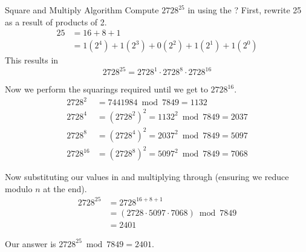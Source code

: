 \begin{example}{Square and Multiply Algorithm}
  Compute $2728^{25}$ in  using the ?
  \tcblower{}
  First, rewrite 25 as a result of products of 2.
  \begin{align*}
    25 &= 16 + 8 + 1 \\
    &= 1 (2^{4}) + 1 (2^{3}) + 0 (2^{2}) + 1 (2^{1}) + 1 (2^{0})
  \end{align*}
  This results in
  \begin{equation*}
    2728^{25} = 2728^{1} \cdot 2728^{8} \cdot 2728^{16}
  \end{equation*}

  Now we perform the squarings required until we get to $2728^{16}$.
  \begin{align*}
    2728^{2} &= 7441984 \bmod 7849 = 1132 \\
    2728^{4} &= {(2728^{2})}^{2} = 1132^{2} \bmod 7849 = 2037 \\
    2728^{8} &= {(2728^{4})}^{2} = 2037^{2} \bmod 7849 = 5097 \\
    2728^{16} &= {(2728^{8})}^{2} = 5097^{2} \bmod 7849 = 7068
  \end{align*}

  Now substituting our values in and multiplying through (ensuring we reduce modulo $n$ at the end).
  \begin{align*}
    2728^{25} &= 2728^{16+8+1} \\
              &= (2728 \cdot 5097 \cdot 7068) \bmod 7849 \\
              &= 2401
  \end{align*}

  Our answer is $2728^{25} \bmod 7849 = 2401$.
\end{example}

